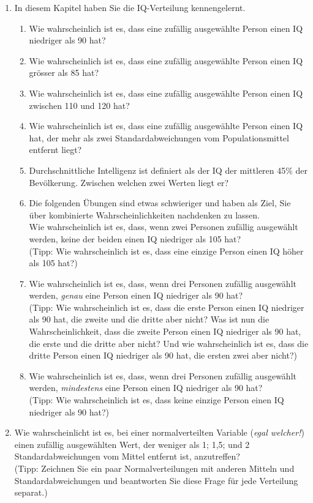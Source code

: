 \documentclass[oneside, 10pt]{book}\usepackage[]{graphicx}\usepackage[]{xcolor}
\begin{document}
\begin{enumerate}
\item In diesem Kapitel haben Sie die IQ-Verteilung kennengelernt.
\begin{enumerate}
\item Wie wahrscheinlich ist es, dass eine zufällig ausgewählte Person einen IQ niedriger als 90 hat?
\item Wie wahrscheinlich ist es, dass eine zufällig ausgewählte Person einen IQ grösser als 85 hat?
\item Wie wahrscheinlich ist es, dass eine zufällig ausgewählte Person einen IQ zwischen 110 und 120 hat?
\item Wie wahrscheinlich ist es, dass eine zufällig ausgewählte Person einen IQ hat, der mehr als zwei Standardabweichungen vom Populationsmittel entfernt liegt?
\item Durchschnittliche Intelligenz ist definiert als der IQ der mittleren 45\% der Bevölkerung. Zwischen welchen zwei Werten liegt er?
\item Die folgenden Übungen sind etwas schwieriger und haben als Ziel, Sie über kombinierte Wahrscheinlichkeiten nachdenken zu lassen.\\
Wie wahrscheinlich ist es, dass, wenn zwei Personen zufällig ausgewählt werden, keine der beiden einen IQ niedriger als 105 hat?\\
(Tipp: Wie wahrscheinlich ist es, dass eine einzige Person einen IQ höher als 105 hat?)
\item Wie wahrscheinlich ist es, dass, wenn drei Personen zufällig ausgewählt werden, \emph{genau} eine Person einen IQ niedriger als 90 hat?\\
(Tipp: Wie wahrscheinlich ist es, dass die erste Person einen IQ niedriger als 90 hat, die zweite und die dritte aber nicht? Was ist nun die Wahrscheinlichkeit, dass die zweite Person einen IQ niedriger als 90 hat, die erste und die dritte aber nicht? Und wie wahrscheinlich ist es, dass die dritte Person einen IQ niedriger als 90 hat, die ersten zwei aber nicht?)
\item Wie wahrscheinlich ist es, dass, wenn drei Personen zufällig ausgewählt werden, \emph{mindestens} eine Person einen IQ niedriger als 90 hat?\\
(Tipp: Wie wahrscheinlich ist es, dass keine einzige Person einen IQ niedriger als 90 hat?)
\end{enumerate}

\item Wie wahrscheinlicht ist es, bei einer normalverteilten Variable (\emph{egal welcher!}) einen zufällig ausgewählten Wert, der weniger als 1; 1,5; und 2 Standardabweichungen vom Mittel entfernt ist, anzutreffen?\\
(Tipp: Zeichnen Sie ein paar Normalverteilungen mit anderen Mitteln und Standardabweichungen und beantworten Sie diese Frage für jede Verteilung separat.)


\end{enumerate}
\end{document}
